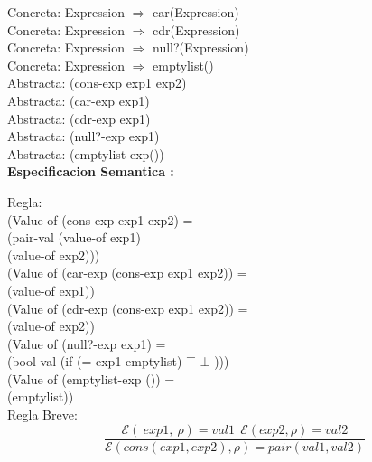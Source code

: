 \documentclass{article}
\begin{document}
Concreta: Expression $\Rightarrow $ car(Expression)\\

Concreta: Expression $\Rightarrow $ cdr(Expression)\\

Concreta: Expression $\Rightarrow $ null?(Expression)\\

Concreta: Expression $\Rightarrow $ emptylist()\\

Abstracta: (cons-exp exp1 exp2)\\

Abstracta: (car-exp exp1)\\

Abstracta: (cdr-exp exp1)\\

Abstracta: (null?-exp exp1)\\

Abstracta: (emptylist-exp())\\ 

\textbf{Especificacion Semantica :} \newline

Regla: \\

(Value of (cons-exp exp1 exp2) = \\
            (pair-val (value-of exp1) \\ 
                      (value-of exp2))) \\ 

(Value of (car-exp (cons-exp exp1 exp2)) = \\
            (value-of exp1)) \\ 
                      
(Value of (cdr-exp (cons-exp exp1 exp2)) = \\
            (value-of exp2))\\
                      
(Value of (null?-exp exp1) = \\
            (bool-val (if (= exp1 emptylist) $\top$ $\bot$  ))) \\
                      
(Value of (emptylist-exp ()) =\\
            (emptylist))\\

Regla Breve: \\


$$
\frac{\mathcal{E} (\: {exp1} ,  \: \rho) = val1 \: \: \mathcal{E} (exp2,\rho) = val2  }{\mathcal{E} (cons (exp1,exp2),\rho)=pair(val1,val2)}
$$
\end{document}
